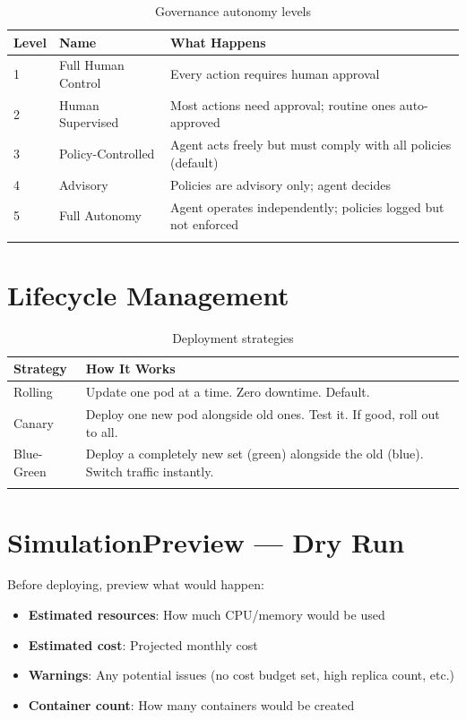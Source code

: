 \documentclass[12pt,a4paper,openany]{report}
\begin{document}
\begin{longtable}{p{1.5cm}p{3.5cm}p{8cm}}
\toprule
\textbf{Level} & \textbf{Name} & \textbf{What Happens} \\
\midrule
1 & Full Human Control & Every action requires human approval \\
2 & Human Supervised & Most actions need approval; routine ones auto-approved \\
3 & Policy-Controlled & Agent acts freely but must comply with all policies (default) \\
4 & Advisory & Policies are advisory only; agent decides \\
5 & Full Autonomy & Agent operates independently; policies logged but not enforced \\
\bottomrule
\caption{Governance autonomy levels}
\end{longtable}

\section{Lifecycle Management}

\begin{longtable}{p{3cm}p{10cm}}
\toprule
\textbf{Strategy} & \textbf{How It Works} \\
\midrule
Rolling & Update one pod at a time. Zero downtime. Default. \\
Canary & Deploy one new pod alongside old ones. Test it. If good, roll out to all. \\
Blue-Green & Deploy a completely new set (green) alongside the old (blue). Switch traffic instantly. \\
\bottomrule
\caption{Deployment strategies}
\end{longtable}

\section{SimulationPreview — Dry Run}

Before deploying, preview what would happen:
\begin{itemize}
    \item \textbf{Estimated resources}: How much CPU/memory would be used
    \item \textbf{Estimated cost}: Projected monthly cost
    \item \textbf{Warnings}: Any potential issues (no cost budget set, high replica count, etc.)
    \item \textbf{Container count}: How many containers would be created
\end{itemize}
\end{document}
